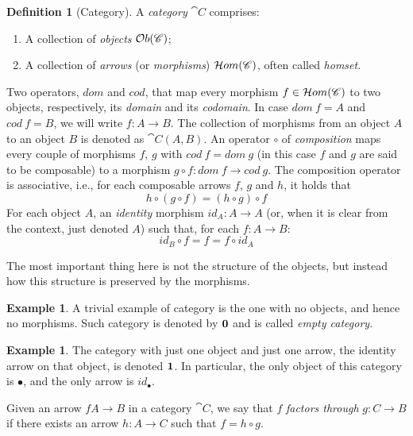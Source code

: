\documentclass[a4paper, twoside,openright]{report}
\theoremstyle{plain}
\theoremstyle{definition}
\newtheorem{definition}[theorem]{Definition}
\newtheorem{example}[theorem]{Example}
\begin{document}
\begin{definition}[Category]\label{def:category}
    A \emph{category} $\cat{C}$ comprises:
    \begin{enumerate}
        \item A collection of \emph{objects} $\mathcal{O}b(\mathscr{C})$;
        \item A collection of \emph{arrows} (or \emph{morphisms}) $\mathcal{H}om(\mathscr{C})$, often called \emph{homset}.
    \end{enumerate}
    Two operators, $dom$ and $cod$, that map every morphism $f \in \mathcal{H}om(\mathscr{C})$ to two objects, respectively, its \emph{domain} and its \emph{codomain}. In case $dom\ f = A$ and $cod\ f = B$, we will write $f: A \rightarrow B$. The collection of morphisms from an object $A$ to an object $B$ is denoted as $\cat{C}(A, B)$.
    An operator $\circ$ of \emph{composition} maps every couple of morphisms $f$, $g$ with $cod\ f = dom \ g$ (in this case $f$ and $g$ are said to be composable) to a morphism $g \circ f : dom\ f \rightarrow cod \ g$. The composition operator is associative, i.e., for each composable arrows $f$, $g$ and $h$, it holds that
    $$
        h \circ (g \circ f) = (h\circ g) \circ f
    $$
    For each object $A$, an \emph{identity} morphism $id_A : A \rightarrow A$ (or, when it is clear from the context, just denoted $A$)  such that, for each $f: A \rightarrow B$:
    \[
        id_B \circ f = f = f \circ id_A 
    \]
\end{definition}

The most important thing here is not the structure of the objects, but instead how this structure is preserved by the morphisms.

\begin{example}\label{ex:0_cat}
    A trivial example of category is the one with no objects, and hence no morphisms. Such category is denoted by $\textbf 0$ and is called \emph{empty category}.
\end{example}

\begin{example}\label{ex:1_cat}
    The category with just one object and just one arrow, the identity arrow on that object, is denoted $\textbf 1$. In particular, the only object of this category is $\bullet$, and the only arrow is $id_{\bullet}$.
\end{example}

Given an arrow $f A \rightarrow B$ in a category $\cat C$, we say that $f$ \emph{factors through} $g: C \rightarrow B$ if there exists an arrow $h: A \rightarrow C$ such that $f = h \circ g$.
\end{document}
